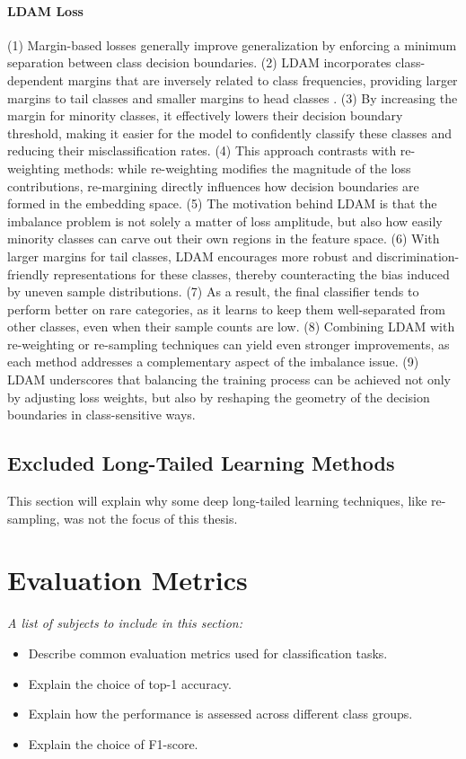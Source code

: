 \paragraph{LDAM Loss}
(1) Margin-based losses generally improve generalization by enforcing a minimum separation between class decision boundaries.
(2) LDAM incorporates class-dependent margins that are inversely related to class frequencies, providing larger margins to tail classes and smaller margins to head classes \cite{zhang2023deep}.
(3) By increasing the margin for minority classes, it effectively lowers their decision boundary threshold, making it easier for the model to confidently classify these classes and reducing their misclassification rates.
(4) This approach contrasts with re-weighting methods: while re-weighting modifies the magnitude of the loss contributions, re-margining directly influences how decision boundaries are formed in the embedding space.
(5) The motivation behind LDAM is that the imbalance problem is not solely a matter of loss amplitude, but also how easily minority classes can carve out their own regions in the feature space.
(6) With larger margins for tail classes, LDAM encourages more robust and discrimination-friendly representations for these classes, thereby counteracting the bias induced by uneven sample distributions.
(7) As a result, the final classifier tends to perform better on rare categories, as it learns to keep them well-separated from other classes, even when their sample counts are low.
(8) Combining LDAM with re-weighting or re-sampling techniques can yield even stronger improvements, as each method addresses a complementary aspect of the imbalance issue.
(9) LDAM underscores that balancing the training process can be achieved not only by adjusting loss weights, but also by reshaping the geometry of the decision boundaries in class-sensitive ways.

\subsection{Excluded Long-Tailed Learning Methods}
This section will explain why some deep long-tailed learning techniques, like re-sampling, was not the focus of this thesis.

\section{Evaluation Metrics}
\textit{A list of subjects to include in this section:}

\begin{itemize}
    \item Describe common evaluation metrics used for classification tasks.
    \item Explain the choice of top-1 accuracy.
    \item Explain how the performance is assessed across different class groups.
    \item Explain the choice of F1-score.
\end{itemize}



